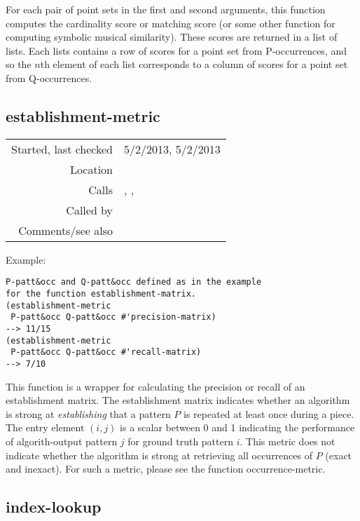 For each pair of point sets in the first and
second arguments, this function computes the
cardinality score or matching score (or some other
function for computing symbolic musical similarity).
These scores are returned in a list of lists. Each
lists contains a row of scores for a point set from
P-occurrences, and so the $n$th element of each list
corresponds to a column of scores for a point set from
Q-occurrences.


\subsection*{establishment-metric}\label{fun:establishment-metric}

\vspace{0.3cm}
\begin{tabular}{r|p{8cm}}
Started, last checked & 5/2/2013, 5/2/2013 \\
Location & \nameref{sec:robust-metrics} \\
Calls & \nameref{fun:establishment-matrix}, \nameref{fun:precision-matrix},\newline \nameref{fun:recall-matrix} \\
Called by & \\
Comments/see also &
\end{tabular}

\vspace{0.5cm}
\noindent Example:
\begin{verbatim}
P-patt&occ and Q-patt&occ defined as in the example
for the function establishment-matrix.
(establishment-metric
 P-patt&occ Q-patt&occ #'precision-matrix)
--> 11/15
(establishment-metric
 P-patt&occ Q-patt&occ #'recall-matrix)
--> 7/10
\end{verbatim}

\noindent This function is a wrapper for calculating
the precision or recall of an establishment matrix.
The establishment matrix indicates whether
an algorithm is strong at \emph{establishing} that a
pattern $P$ is repeated at least once during a piece.
The entry element $(i, j)$ is a scalar between 0 and 1
indicating the performance of algorith-output pattern
$j$ for ground truth pattern $i$. This metric does not
indicate whether the algorithm is strong at retrieving
all occurrences of $P$ (exact and inexact). For such a
metric, please see the function occurrence-metric.


\subsection*{index-lookup}\label{fun:index-lookup}

